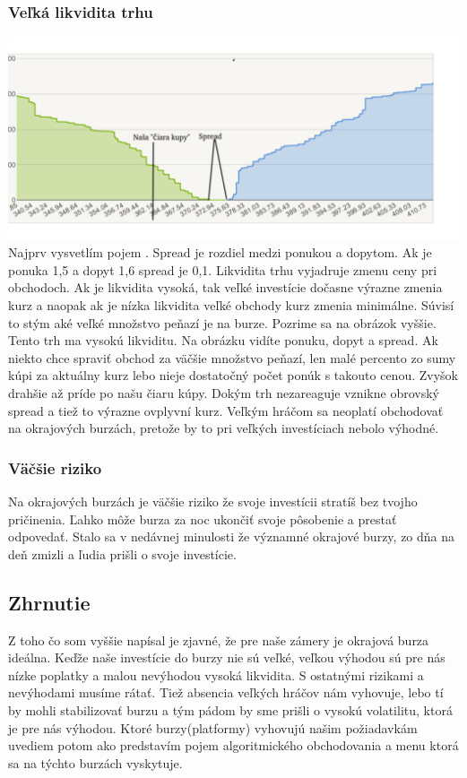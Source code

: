 \subsubsection{Veľká likvidita trhu} 
\includegraphics[width=1\textwidth]{stamp} 
Najprv vysvetlím pojem \cite{ZAC}. Spread je rozdiel medzi ponukou a dopytom. Ak je ponuka 1,5 a dopyt 1,6 spread je 0,1. Likvidita trhu vyjadruje zmenu ceny pri obchodoch. Ak je likvidita vysoká, tak veľké investície dočasne výrazne zmenia kurz a naopak ak je nízka likvidita veľké obchody kurz zmenia minimálne. Súvisí to stým aké veľké množstvo peňazí je na burze. Pozrime sa na obrázok vyššie. Tento trh ma vysokú likviditu. Na obrázku vidíte ponuku, dopyt a spread. Ak niekto chce spraviť obchod za väčšie množstvo peňazí, len malé percento zo sumy kúpi za aktuálny kurz lebo nieje dostatočný počet ponúk s takouto cenou. Zvyšok drahšie až príde po našu čiaru kúpy. Dokým trh nezareaguje vznikne obrovský spread a tiež to výrazne ovplyvní kurz. Veľkým hráčom sa neoplatí obchodovať na okrajových burzách, pretože by to pri veľkých investíciach nebolo výhodné. 
\subsubsection{Väčšie riziko} 
Na okrajových burzách je väčšie riziko že svoje investícii stratíš bez tvojho pričinenia. Ľahko môže burza za noc ukončiť svoje pôsobenie a prestať odpovedať. Stalo sa v nedávnej minulosti že významné okrajové burzy, zo dňa na deň zmizli a ľudia prišli o svoje investície.  
\subsection{Zhrnutie} 
Z toho čo som vyššie napísal je zjavné,  že pre naše zámery je okrajová burza ideálna. Keďže naše investície do burzy nie sú veľké, veľkou výhodou sú pre nás nízke poplatky a malou nevýhodou vysoká likvidita. S ostatnými rizikami a nevýhodami musíme rátať. Tiež absencia veľkých hráčov nám vyhovuje, lebo tí by mohli stabilizovať burzu a tým pádom by sme prišli o vysokú volatilitu, ktorá je pre nás výhodou. Ktoré burzy(platformy) vyhovujú našim požiadavkám uvediem potom ako predstavím pojem algoritmického obchodovania a menu ktorá sa na týchto burzách vyskytuje.
